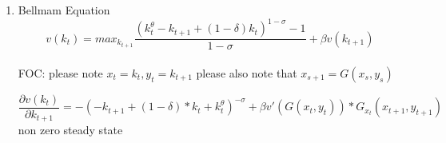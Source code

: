 \begin{enumerate}
    \item  Bellmam Equation $$v(k_t)= max_{k_{t+1}} \frac{(k_t^\theta -k_{t+1}+(1-\delta)k_t)^{1-\sigma}-1}{1-\sigma}+\beta v(k_{t+1})$$\\
    FOC: please note $x_t=k_t, y_t=k_{t+1}$ please also note that $x_{s+1}=G(x_s,y_s)$
    
    $$\frac{\partial v(k_t)}{\partial k_{t+1}}=-( -k_{t+1} + (1-\delta)*k_t +k_t^\theta)^{-\sigma}
   +\beta v'(G(x_t,y_t))*G_{x_t}(x_{t+1},y_{t+1})$$
   non zero steady state 
   $$$$
\end{enumerate}